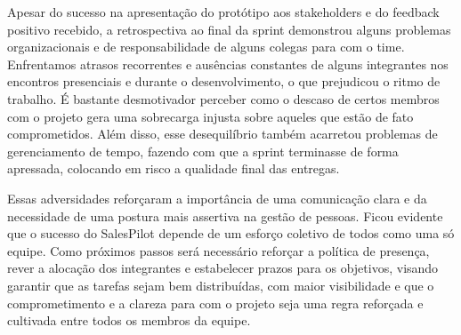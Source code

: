 Apesar do sucesso na apresentação do protótipo aos stakeholders e do feedback positivo recebido, a retrospectiva ao final da sprint demonstrou alguns problemas organizacionais e de responsabilidade de alguns colegas para com o time. Enfrentamos atrasos recorrentes e ausências constantes de alguns integrantes nos encontros presenciais e durante o desenvolvimento, o que prejudicou o ritmo de trabalho. É bastante desmotivador perceber como o descaso de certos membros com o projeto gera uma sobrecarga injusta sobre aqueles que estão de fato comprometidos. Além disso, esse desequilíbrio também acarretou problemas de gerenciamento de tempo, fazendo com que a sprint terminasse de forma apressada, colocando em risco a qualidade final das entregas. 

Essas adversidades reforçaram a importância de uma comunicação clara e da necessidade de uma postura mais assertiva na gestão de pessoas. Ficou evidente que o sucesso do SalesPilot depende de um esforço coletivo de todos como uma só equipe. Como próximos passos será necessário reforçar a política de presença, rever a alocação dos integrantes e estabelecer prazos para os objetivos, visando garantir que as tarefas sejam bem distribuídas, com maior visibilidade e que o comprometimento e a clareza para com o projeto seja uma regra reforçada e cultivada entre todos os membros da equipe.